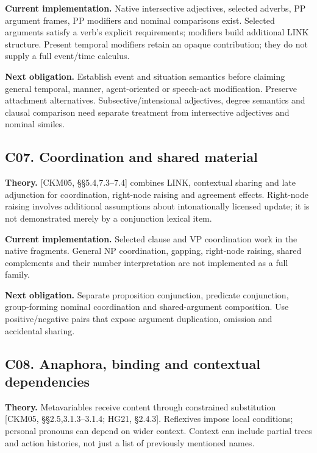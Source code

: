 \documentclass[11pt,a4paper]{article}
\begin{document}
\textbf{Current implementation.} Native intersective adjectives,
selected adverbs, PP argument frames, PP modifiers and nominal
comparisons exist. Selected arguments satisfy a verb's explicit
requirements; modifiers build additional LINK structure. Present
temporal modifiers retain an opaque contribution; they do not supply a
full event/time calculus.

\textbf{Next obligation.} Establish event and situation semantics before
claiming general temporal, manner, agent-oriented or speech-act
modification. Preserve attachment alternatives. Subsective/intensional
adjectives, degree semantics and clausal comparison need separate
treatment from intersective adjectives and nominal similes.

\subsection{C07. Coordination and shared
material}\label{c07.-coordination-and-shared-material}

\textbf{Theory.} {[}CKM05, §§5.4,7.3--7.4{]} combines LINK, contextual
sharing and late adjunction for coordination, right-node raising and
agreement effects. Right-node raising involves additional assumptions
about intonationally licensed update; it is not demonstrated merely by a
conjunction lexical item.

\textbf{Current implementation.} Selected clause and VP coordination
work in the native fragments. General NP coordination, gapping,
right-node raising, shared complements and their number interpretation
are not implemented as a full family.

\textbf{Next obligation.} Separate proposition conjunction, predicate
conjunction, group-forming nominal coordination and shared-argument
composition. Use positive/negative pairs that expose argument
duplication, omission and accidental sharing.

\subsection{C08. Anaphora, binding and contextual
dependencies}\label{c08.-anaphora-binding-and-contextual-dependencies}

\textbf{Theory.} Metavariables receive content through constrained
substitution {[}CKM05, §§2.5,3.1.3--3.1.4; HG21, §2.4.3{]}. Reflexives
impose local conditions; personal pronouns can depend on wider context.
Context can include partial trees and action histories, not just a list
of previously mentioned names.
\end{document}
